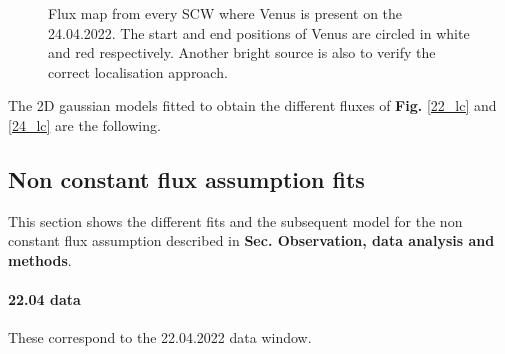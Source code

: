 \documentclass[
	a4paper, %
	10pt, %
	unnumberedsections, %
	twoside, %
]{LTJournalArticle}
\begin{document}
\begin{figure}[H]
\begin{subfigure}{.45\textwidth}
        \end{subfigure}
        \caption{Flux map from every SCW where Venus is present on the 24.04.2022. The start and end positions of Venus are circled in white and red respectively. Another bright source is also to verify the correct localisation approach.}
        \label{24_map}
    \end{figure}

The 2D gaussian models fitted to obtain the different fluxes of \textbf{Fig.} \ref{22_lc} and \ref{24_lc} are the following.

\subsection{Non constant flux assumption fits}
This section shows the different fits and the subsequent model for the non constant flux assumption described in \textbf{Sec. Observation, data analysis and methods}.
\paragraph{22.04 data}
These correspond to the 22.04.2022 data window.
\end{document}
